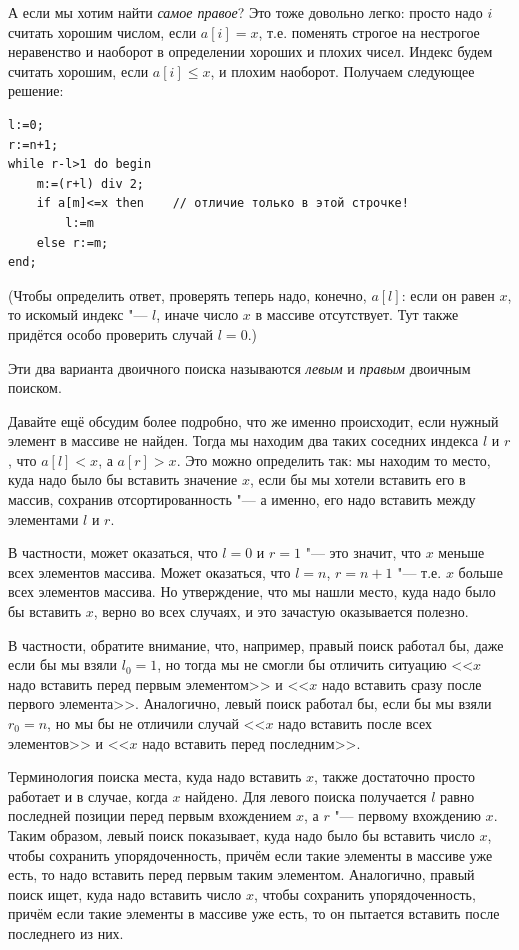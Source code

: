 \documentclass[a4paper,10pt]{problems}
\begin{document}
А если мы хотим найти \textit{самое правое}? 
Это тоже довольно легко: просто надо $i$ считать хорошим числом, если $a[i]=x$, 
т.е. поменять строгое на нестрогое неравенство и наоборот в определении хороших и плохих чисел.
Индекс будем считать хорошим, если $a[i]\leq x$, и плохим наоборот. Получаем следующее решение:
\begin{codesampleo}\begin{verbatim}
l:=0;
r:=n+1;  
while r-l>1 do begin    
    m:=(r+l) div 2;
    if a[m]<=x then    // отличие только в этой строчке!
        l:=m
    else r:=m;
end;
\end{verbatim}
\end{codesampleo}
(Чтобы определить ответ, проверять теперь надо, конечно, $a[l]$: если он равен $x$, 
то искомый индекс "--- $l$,  иначе число $x$ в массиве отсутствует. Тут также придётся особо проверить случай $l=0$.)

Эти два варианта двоичного поиска называются \textit{левым} и \textit{правым} двоичным поиском.

Давайте ещё обсудим более подробно, что же именно происходит, если нужный элемент в массиве не найден.
Тогда мы находим два таких соседних индекса $l$ и $r$, что $a[l]<x$, а $a[r]>x$.
Это можно определить так: мы находим то место, куда надо было бы вставить значение $x$, 
если бы мы хотели вставить его в массив, сохранив отсортированность "--- а именно,
его надо вставить между элементами $l$ и $r$.

В частности, может оказаться, что $l=0$ и $r=1$ "--- это значит, что $x$ меньше всех элементов массива.
Может оказаться, что $l=n$, $r=n+1$ "--- т.е. $x$ больше всех элементов массива.
Но утверждение, что мы нашли место, куда надо было бы вставить $x$, верно во всех случаях, 
и это зачастую оказывается полезно.

В частности, обратите внимание, что, например, правый поиск работал бы, даже если бы мы взяли $l_0=1$, 
но тогда мы не смогли бы отличить ситуацию <<$x$ надо вставить перед первым элементом>> 
и <<$x$ надо вставить сразу после первого элемента>>.
Аналогично, левый поиск работал бы, если бы мы взяли $r_0=n$, но мы бы не отличили 
случай <<$x$ надо вставить после всех элементов>> и <<$x$ надо вставить перед последним>>.

Терминология поиска места, куда надо вставить $x$, также достаточно просто
работает и в случае, когда $x$ найдено.
Для левого поиска получается $l$ равно последней позиции перед первым вхождением $x$,
а $r$ "--- первому вхождению $x$. 
Таким образом, левый поиск показывает, куда надо было бы вставить число $x$,
чтобы сохранить упорядоченность, причём если такие элементы в массиве уже есть,
то надо вставить перед первым таким элементом.
Аналогично, правый поиск ищет, куда надо вставить число $x$, чтобы сохранить упорядоченность,
причём если такие элементы в массиве уже есть, то он пытается вставить после последнего из них.
\end{document}
